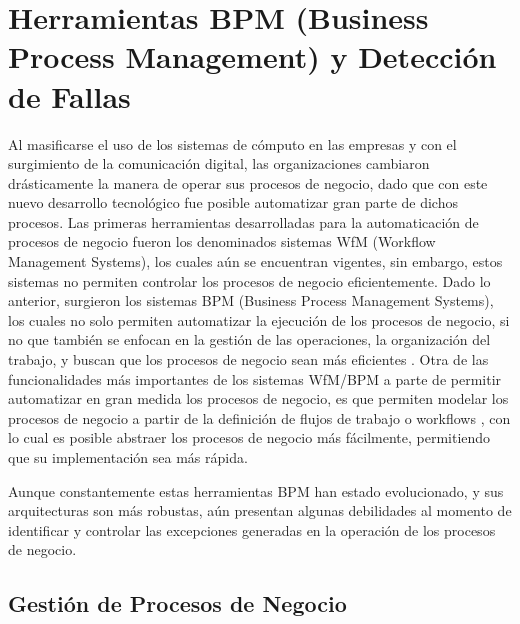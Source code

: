 
\chapter{Herramientas BPM (Business Process Management) y Detección de Fallas}  %

\ifpdf
    \graphicspath{{Chapter1/Figs/Raster/}{Chapter1/Figs/PDF/}{Chapter1/Figs/}}
\else
    \graphicspath{{Chapter1/Figs/Vector/}{Chapter1/Figs/}}
\fi

Al masificarse el uso de los sistemas de cómputo en las empresas y con el surgimiento de la comunicación digital, las organizaciones cambiaron drásticamente la manera de operar sus procesos de negocio, dado que con este nuevo desarrollo tecnológico fue posible automatizar gran parte de dichos procesos. Las primeras herramientas desarrolladas para la automaticación de procesos de negocio fueron los denominados sistemas WfM (Workflow Management Systems), los cuales aún se encuentran vigentes, sin embargo, estos sistemas no permiten controlar los procesos de negocio eficientemente. Dado lo anterior, surgieron los sistemas BPM (Business Process Management Systems), los cuales no solo permiten automatizar la ejecución de los procesos de negocio, si no que también se enfocan en la gestión de las operaciones, la organización del trabajo, y buscan que los procesos de negocio sean más eficientes \cite{VanderAalst2013,VanderAalst2016}. Otra de las funcionalidades más importantes de los sistemas WfM/BPM a parte de permitir automatizar en gran medida los procesos de negocio, es que permiten modelar los procesos de negocio a partir de la definición de flujos de trabajo o workflows \cite{VanderAalst2004}, con lo cual es posible abstraer los procesos de negocio más fácilmente, permitiendo que su implementación sea más rápida. 

Aunque constantemente estas herramientas BPM han estado evolucionado, y sus arquitecturas son más robustas, aún presentan algunas debilidades al momento de identificar y controlar las excepciones generadas en la operación de los procesos de negocio. 

\section{Gestión de Procesos de Negocio} %
\label{section1.1}

